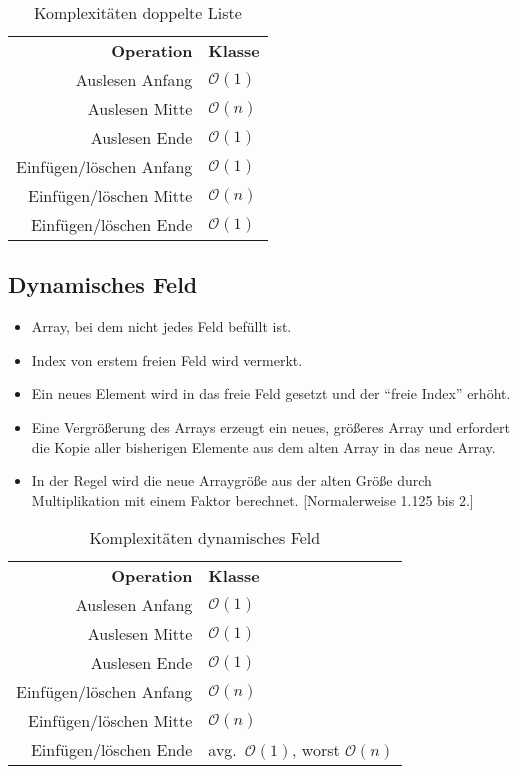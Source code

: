 \begin{table}[htb]
\centering\begin{tabular}{rl}
\bfseries Operation & \bfseries Klasse \\ 
Auslesen Anfang & $\mathcal{O}(1)$ \\ 
Auslesen Mitte & $\mathcal{O}(n)$ \\ 
Auslesen Ende & $\mathcal{O}(1)$ \\ 
Einfügen/löschen Anfang & $\mathcal{O}(1)$ \\ 
Einfügen/löschen Mitte & $\mathcal{O}(n)$ \\ 
Einfügen/löschen Ende & $\mathcal{O}(1)$
\end{tabular}

\caption{Komplexitäten doppelte Liste}
\end{table}


\subsection{Dynamisches Feld}
\begin{itemize}
  \item Array, bei dem nicht jedes Feld befüllt ist.
  \item Index von erstem freien Feld wird vermerkt.
  \item Ein neues Element wird in das freie Feld gesetzt und der \enquote{freie Index} erhöht.
  \item Eine Vergrößerung des Arrays erzeugt ein neues, größeres Array und erfordert die Kopie aller bisherigen Elemente aus dem alten Array in das neue Array.
  \item In der Regel wird die neue Arraygröße aus der alten Größe durch Multiplikation mit einem Faktor berechnet.
        [Normalerweise 1.125 bis 2.]
\end{itemize}

\begin{table}[htb]
\centering\begin{tabular}{rl}
\bfseries Operation & \bfseries Klasse \\
Auslesen Anfang & $\mathcal{O}(1)$ \\ 
Auslesen Mitte & $\mathcal{O}(1)$ \\ 
Auslesen Ende & $\mathcal{O}(1)$ \\ 
Einfügen/löschen Anfang & $\mathcal{O}(n)$ \\ 
Einfügen/löschen Mitte & $\mathcal{O}(n)$ \\ 
Einfügen/löschen Ende & avg.~$\mathcal{O}(1)$, worst $\mathcal{O}(n)$
\end{tabular}

\caption{Komplexitäten dynamisches Feld}
\end{table}


